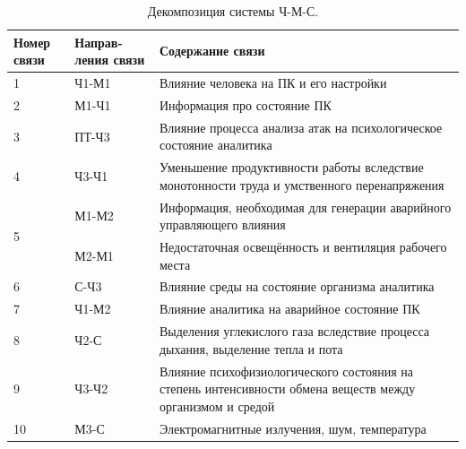 \begin{table}
    \caption{Декомпозиция системы Ч-М-С.}
    \label{table:worker_safety_HME}
    \begin{tabular}{| m{1.3cm} | m{2cm} | m{11.7cm} |}
        \hline
        Номер связи & Направ- ления связи & Содержание связи                                                                                           \\ \hline
        1           & Ч1-М1              & Влияние человека на ПК и его настройки                                                                     \\ \hline
        2           & М1-Ч1              & Информация про состояние ПК                                                                                \\ \hline
        3           & ПТ-Ч3              & Влияние процесса анализа атак на психологическое состояние аналитика                                       \\ \hline
        4           & Ч3-Ч1              & Уменьшение продуктивности работы вследствие монотонности труда и умственного перенапряжения                \\ \hline
        \multirow{2}{*}{5} & М1-М2       & Информация, необходимая для генерации аварийного управляющего влияния                                      \\ \cline{2-3}
                           & М2-М1       & Недостаточная освещённость и вентиляция рабочего места                                                     \\ \hline
        6           & С-Ч3               & Влияние среды на состояние организма аналитика                                                             \\ \hline
        7           & Ч1-М2              & Влияние аналитика на аварийное состояние ПК                                                                \\ \hline
        8           & Ч2-С               & Выделения углекислого газа вследствие процесса дыхания, выделение тепла и пота                             \\ \hline
        9           & Ч3-Ч2              & Влияние психофизиологического состояния на степень интенсивности обмена веществ между организмом и средой  \\ \hline
        10          & М3-С               & Электромагнитные излучения, шум, температура                                                               \\ \hline
    \end{tabular}
\end{table}

